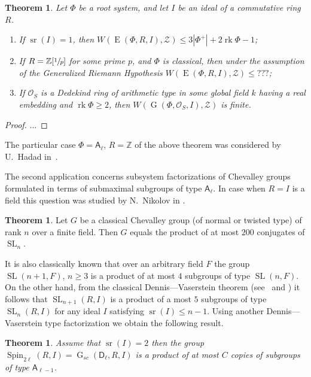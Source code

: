 \documentclass[12pt]{amsart}
\numberwithin{equation}{section}
\newcounter{thmcounter} \newcounter{lemmacounter}
\newtheorem{thm}[thmcounter]{Theorem}
\theoremstyle{definition}
\newtheorem*{thm*}{Theorem}
\DeclareMathOperator{\G}{G}
\DeclareMathOperator{\SL}{SL}
\DeclareMathOperator{\E}{E}
\DeclareMathOperator{\sr}{sr}
\DeclareMathOperator{\Spin}{Spin}
\DeclareMathOperator{\rk}{rk}
\newcommand{\rA}{\mathsf{A}}
\newcommand{\rD}{\mathsf{D}}
\begin{document}
\begin{thm} Let $\Phi$ be a root system, and let $I$ be an ideal of a commutative ring $R$.
\begin{enumerate}
\item If $\sr(I) = 1$, then $W(\E(\Phi,R,I),\mathcal{Z})\leqslant 3|\Phi^+|+2\rk\Phi-1$;
\item If $R = \mathbb{Z}[\sfrac{1}{p}]$ for some prime $p$, and $\Phi$ is classical, then under the assumption of the Generalized Riemann Hypothesis $W(\E(\Phi,R,I),\mathcal{Z})\leqslant ???$;
\item If $\mathcal{O}_S$ is a Dedekind ring of arithmetic type in some global field $k$ having a real embedding and $\rk\Phi\geqslant2$, then $W(\G(\Phi,\mathcal{O}_S,I),\mathcal{Z})$ is finite.
\end{enumerate}
\end{thm}
\begin{proof}
...
\end{proof}
The particular case $\Phi = \rA_\ell$, $R = \mathbb{Z}$ of the above theorem was considered by U.~Hadad in~\cite[Theorem~1.6]{Ha12}.

The second application concerns subsystem factorizations of Chevalley groups formulated in terms of submaximal subgroups of type $\rA_\ell$.
In case when $R=I$ is a field this question was studied by N.~Nikolov in \cite{NikProdDecomp}. 
\begin{thm*} Let $G$ be a classical Chevalley group (of normal or twisted type) of rank $n$ over a finite field.
Then $G$ equals the product of at most $200$ conjugates of $\SL_n$. \end{thm*}

It is also classically known that over an arbitrary field $F$ the group $\SL(n+1, F)$, $n\geq 3$ is a product of at most $4$ subgroups of type $\SL(n, F)$.
On the other hand, from the classical Dennis---Vaserstein theorem (see~\cite{Va69} and \cite[Lemma~2.1]{ST76})
it follows that $\SL_{n+1}(R, I)$ is a product of a most $5$ subgroups of type $\SL_n(R, I)$ for any ideal $I$ satisfying $\sr(I)\leqslant n-1$.
Using another Dennis---Vaserstein type factorization we obtain the following result.
\begin{thm} Assume that $\sr(I) = 2$ then the group $\Spin_{2\ell}(R, I)=\G_{sc}(\rD_\ell, R, I)$ is a product of at most $C$ copies of subgroups of type $\rA_{\ell-1}$. \end{thm}
\end{document}
